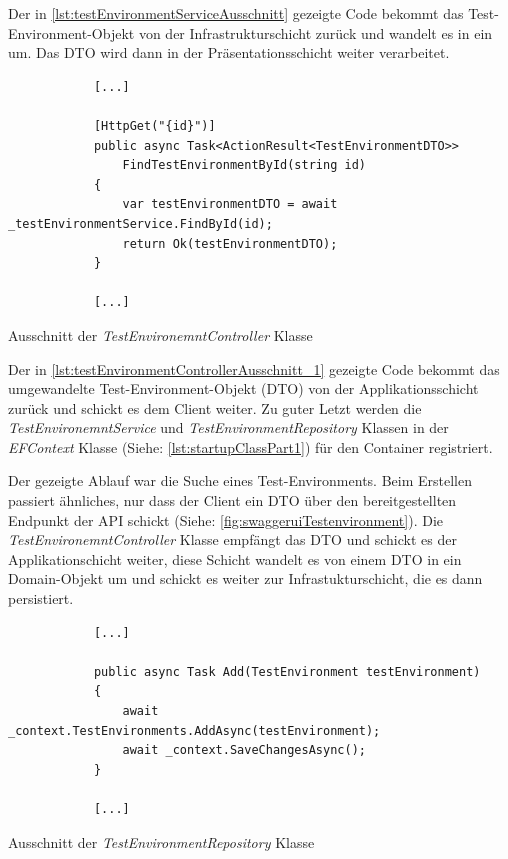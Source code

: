 \documentclass[a4paper, fontsize=11pt, parskip=half, twoside]{scrreprt}
\begin{document}
	Der in \autoref{lst:testEnvironmentServiceAusschnitt} gezeigte Code bekommt das Test-Environment-Objekt von der Infrastrukturschicht zurück und wandelt es in ein  um.
	Das \ac{DTO} wird dann in der Präsentationsschicht weiter verarbeitet.
	
	\begin{listing}[ht]
		\begin{verbatim}
			[...]
			
			[HttpGet("{id}")]
			public async Task<ActionResult<TestEnvironmentDTO>> 
				FindTestEnvironmentById(string id)
			{
				var testEnvironmentDTO = await _testEnvironmentService.FindById(id);
				return Ok(testEnvironmentDTO);
			}
			
			[...]
		\end{verbatim}
		\caption{Ausschnitt der \emph{TestEnvironemntController} Klasse}
		\label{lst:testEnvironmentControllerAusschnitt_1}
	\end{listing}

	Der in \autoref{lst:testEnvironmentControllerAusschnitt_1} gezeigte Code bekommt das umgewandelte Test-Environment-Objekt (\ac{DTO}) von der Applikationsschicht zurück und schickt es dem Client weiter.
	Zu guter Letzt werden die \emph{TestEnvironemntService} und \emph{TestEnvironmentRepository} Klassen in der \emph{EFContext} Klasse (Siehe: \autoref{lst:startupClassPart1}) für den  Container registriert.
	
	Der gezeigte Ablauf war die Suche eines Test-Environments. 
	Beim Erstellen passiert ähnliches, nur dass der Client ein \ac{DTO} über den bereitgestellten Endpunkt der \ac{API} schickt (Siehe: \autoref{fig:swaggeruiTestenvironment}).
	Die \emph{TestEnvironemntController} Klasse empfängt das \ac{DTO} und schickt es der Applikationschicht weiter, diese Schicht wandelt es von einem \ac{DTO} in ein Domain-Objekt um und schickt es weiter zur Infrastukturschicht, die es dann persistiert.
	
	\begin{listing}[ht]
		\begin{verbatim}
			[...]
			
			public async Task Add(TestEnvironment testEnvironment)
			{
				await _context.TestEnvironments.AddAsync(testEnvironment);
				await _context.SaveChangesAsync();
			}
			
			[...]
		\end{verbatim}
		\caption{Ausschnitt der \emph{TestEnvironmentRepository} Klasse}
		\label{lst:testEnvironmentRepositoryAusschnitt_2}
	\end{listing}
	
\end{document}
